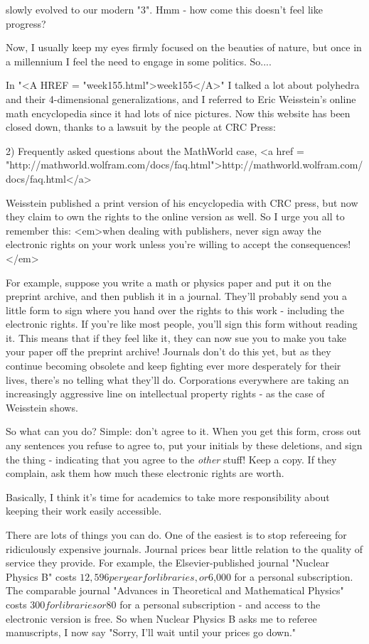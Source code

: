 slowly evolved to our modern "3".  Hmm - how come this doesn't feel
like progress?

Now, I usually keep my eyes firmly focused on the beauties of nature,
but once in a millennium I feel the need to engage in some politics.  
So....

In "<A HREF = "week155.html">week155</A>" I talked a lot about polyhedra and their 4-dimensional
generalizations, and I referred to Eric Weisstein's online math
encyclopedia since it had lots of nice pictures.  Now this website 
has been closed down, thanks to a lawsuit by the people at CRC Press:

2) Frequently asked questions about the MathWorld case, <a href = "http://mathworld.wolfram.com/docs/faq.html">http://mathworld.wolfram.com/docs/faq.html</a>

Weisstein published a print version of his encyclopedia with CRC press,
but now they claim to own the rights to the online version as well.  So
I urge you all to remember this: <em>when dealing with publishers, never 
sign away the electronic rights on your work unless you're willing to 
accept the consequences!</em>

For example, suppose you write a math or physics paper and put it on the
preprint archive, and then publish it in a journal.  They'll probably
send you a little form to sign where you hand over the rights to this
work - including the electronic rights.  If you're like most people,
you'll sign this form without reading it.  This means that if they feel
like it, they can now sue you to make you take your paper off the
preprint archive!  Journals don't do this yet, but as they continue
becoming obsolete and keep fighting ever more desperately for their
lives, there's no telling what they'll do.  Corporations everywhere are
taking an increasingly aggressive line on intellectual property rights -
as the case of Weisstein shows.

So what can you do?  Simple: don't agree to it.  When you get this form,
cross out any sentences you refuse to agree to, put your initials by
these deletions, and sign the thing - indicating that you agree to the
\emph{other} stuff!  Keep a copy.  If they complain, ask them how much these
electronic rights are worth.

Basically, I think it's time for academics to take more responsibility
about keeping their work easily accessible.  

There are lots of things you can do.  One of the easiest is to stop
refereeing for ridiculously expensive journals.  Journal prices bear
little relation to the quality of service they provide.  For example,
the Elsevier-published journal "Nuclear Physics B" costs $12,596 per
year for libraries, or $6,000 for a personal subscription.  The
comparable journal "Advances in Theoretical and Mathematical Physics"
costs $300 for libraries or $80 for a personal subscription - and
access to the electronic version is free.  So when Nuclear Physics B
asks me to referee manuscripts, I now say "Sorry, I'll wait until your
prices go down."  

